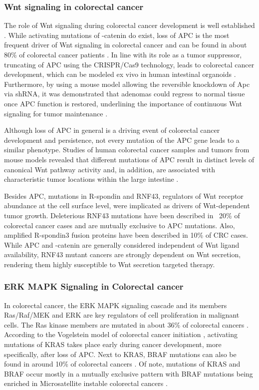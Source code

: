 \begin{flushleft}
\subsubsection{Wnt signaling in colorectal cancer}
The role of Wnt signaling during colorectal cancer development is well established \cite{Polakis2007}. While activating mutations of \textbeta-catenin do exist, loss of APC is the most frequent driver of Wnt signaling in colorectal cancer and can be found in about 80\% of colorectal cancer patients \cite{Fearon1989}. In line with its role as a tumor suppressor, truncating of APC using the CRISPR/Cas9 technology, leads to colorectal cancer development, which can be modeled ex vivo in human intestinal organoids \cite{Matano2015, Drost2015SequentialCells}. Furthermore, by using a mouse model allowing the reversible knockdown of Apc via shRNA, it was demonstrated that adenomas could regress to normal tissue once APC function is restored, underlining the importance of continuous Wnt signaling for tumor maintenance \cite{Dow2015}. \par
Although loss of APC in general is a driving event of colorectal cancer development and persistence, not every mutation of the APC gene leads to a similar phenotype. Studies of human colorectal cancer samples and tumors from mouse models revealed that different mutations of APC result in distinct levels of canonical Wnt pathway activity and, in addition, are associated with characteristic tumor locations within the large intestine \cite{Christie2013, Buchert2010}. \par

Besides APC, mutations in R-spondin and RNF43, regulators of Wnt receptor abundance at the cell surface level, 
were implicated as drivers of Wnt-dependent tumor growth. Deleterious RNF43 mutations have been described in ~20\% of colorectal cancer cases and are mutually exclusive to APC mutations. Also, amplified R-spondin3 fusion proteins have been described in 10\% of CRC cases. While APC and \textbeta-catenin are generally considered independent of Wnt ligand availability, RNF43 mutant cancers are strongly dependent on Wnt secretion, rendering them highly susceptible to Wnt secretion targeted therapy.

\subsubsection{ERK MAPK Signaling in Colorectal cancer}


In colorectal cancer, the ERK MAPK signaling cascade and its members Ras/Raf/MEK and ERK are key regulators of cell proliferation in malignant cells. The Ras kinase members are mutated in about 36\% of colorectal cancers \cite{Oncol2005}. According to the Vogelstein model of colorectal cancer initiation \cite{Fearon1989}, activating mutations of KRAS takes place early during cancer development, more specifically, after loss of APC.
Next to KRAS, BRAF mutations can also be found in around 10\% of colorectal cancers \cite{Oncol2005}. Of note, mutations of KRAS and BRAF occur mostly in a mutually exclusive pattern with BRAF mutations being enriched in Microsatellite instable colorectal cancers \cite{Oncol2005, Sahin2013}. 


\end{flushleft}
